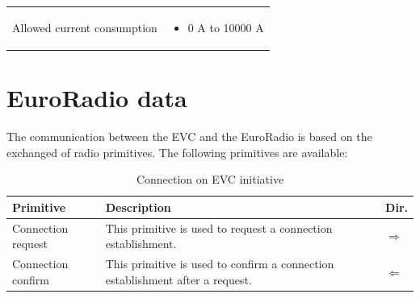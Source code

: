 \documentclass[nocc]{template/openetcs_report}
\begin{document}
\begin{longtable}{|l|l|}
\begin{minipage}[t]{0.5\linewidth}
					\end{minipage} \\
				\hline
				\begin{minipage}[t]{0.5\linewidth} Allowed current consumption	\end{minipage} 
				&	\begin{minipage}[t]{0.5\linewidth}
						\begin{itemize}
							\item 0 A to 10000 A
						\end{itemize}
					\end{minipage} \\
				\hline				
				\end{longtable}
\chapter{EuroRadio data}
\label{euroradio_data}
The communication between the EVC and the EuroRadio is based on the exchanged of radio primitives.
The following primitives are available:
			\begin{longtable}{|l|l|l|}
				\caption{Connection on EVC initiative}\\ 
				\hline
				
					\begin{minipage}[t]{0.3\linewidth} \textbf{Primitive}	\end{minipage}
				&	\begin{minipage}[t]{0.6\linewidth} \textbf{Description}	\end{minipage}
				&	\begin{minipage}[t]{0.1\linewidth} \textbf{Dir.} \end{minipage} \\
				
				\hline
				
					\begin{minipage}[t]{0.3\linewidth}Connection request \end{minipage}
					&\begin{minipage}[t]{0.6\linewidth} This primitive is used to request a connection establishment.	\end{minipage}
					&\begin{minipage}[t]{0.1\linewidth} $\Rightarrow$  \end{minipage} \\
				
				\hline
								
					\begin{minipage}[t]{0.3\linewidth}Connection confirm \end{minipage}
					&\begin{minipage}[t]{0.6\linewidth} This primitive is used to confirm a connection establishment after a request.	\end{minipage}
					&\begin{minipage}[t]{0.1\linewidth} $\Leftarrow$ \end{minipage} \\
				
				\hline									
			\end{longtable}
			
\end{document}
